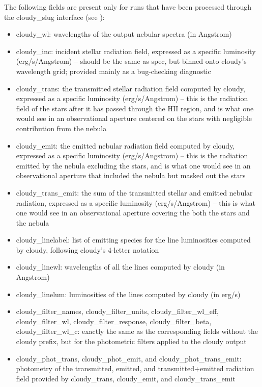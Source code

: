 \documentclass[letterpaper,10pt,english]{sphinxmanual}
\begin{document}
The following fields are present only for runs that have been processed through the cloudy\_slug interface (see {\hyperref[cloudy:sec-cloudy-slug]{\emph{}}}):
\begin{itemize}
\item {} 
cloudy\_wl: wavelengths of the output nebular spectra (in Angstrom)

\item {} 
cloudy\_inc: incident stellar radiation field, expressed as a specific luminosity (erg/s/Angstrom) -- should be the same as spec, but binned onto cloudy's wavelength grid; provided mainly as a bug-checking diagnostic

\item {} 
cloudy\_trans: the transmitted stellar radiation field computed by cloudy, expressed as a specific luminosity (erg/s/Angstrom) -- this is the radiation field of the stars after it has passed through the HII region, and is what one would see in an observational aperture centered on the stars with negligible contribution from the nebula

\item {} 
cloudy\_emit: the emitted nebular radiation field computed by cloudy, expressed as a specific luminosity (erg/s/Angstrom) -- this is the radiation emitted by the nebula excluding the stars, and is what one would see in an observational aperture that included the nebula but masked out the stars

\item {} 
cloudy\_trans\_emit: the sum of the transmitted stellar and emitted nebular radiation, expressed as a specific luminosity (erg/s/Angstrom) -- this is what one would see in an observational aperture covering the both the stars and the nebula

\item {} 
cloudy\_linelabel: list of emitting species for the line luminosities computed by cloudy, following cloudy's 4-letter notation

\item {} 
cloudy\_linewl: wavelengths of all the lines computed by cloudy (in Angstrom)

\item {} 
cloudy\_linelum: luminosities of the lines computed by cloudy (in erg/s)

\item {} 
cloudy\_filter\_names, cloudy\_filter\_units, cloudy\_filter\_wl\_eff, cloudy\_filter\_wl, cloudy\_filter\_response, cloudy\_filter\_beta, cloudy\_filter\_wl\_c: exactly the same as the corresponding fields without the cloudy prefix, but for the photometric filters applied to the cloudy output

\item {} 
cloudy\_phot\_trans, cloudy\_phot\_emit, and cloudy\_phot\_trans\_emit: photometry of the transmitted, emitted, and transmitted+emitted radiation field provided by cloudy\_trans, cloudy\_emit, and cloudy\_trans\_emit

\end{itemize}
\end{document}
